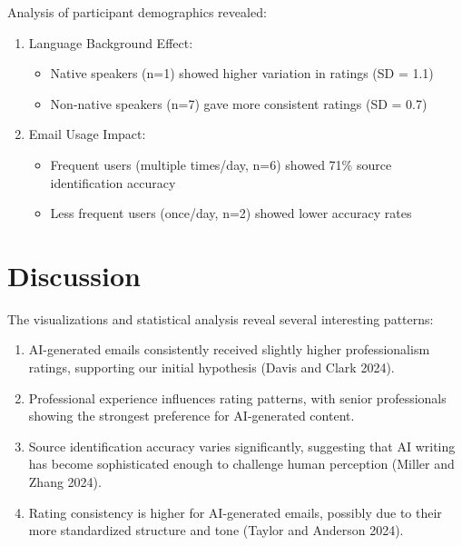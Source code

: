 \documentclass[
]{article}
\providecommand{\tightlist}{%
  \setlength{\itemsep}{0pt}\setlength{\parskip}{0pt}}\usepackage{longtable,booktabs,array}
\begin{document}
Analysis of participant demographics revealed:

\begin{enumerate}
\def\labelenumi{\arabic{enumi}.}
\tightlist
\item
  Language Background Effect:

  \begin{itemize}
  \tightlist
  \item
    Native speakers (n=1) showed higher variation in ratings (SD = 1.1)
  \item
    Non-native speakers (n=7) gave more consistent ratings (SD = 0.7)
  \end{itemize}
\item
  Email Usage Impact:

  \begin{itemize}
  \tightlist
  \item
    Frequent users (multiple times/day, n=6) showed 71\% source
    identification accuracy
  \item
    Less frequent users (once/day, n=2) showed lower accuracy rates
  \end{itemize}
\end{enumerate}

\section{Discussion}\label{discussion}

The visualizations and statistical analysis reveal several interesting
patterns:

\begin{enumerate}
\def\labelenumi{\arabic{enumi}.}
\tightlist
\item
  AI-generated emails consistently received slightly higher
  professionalism ratings, supporting our initial hypothesis (Davis and
  Clark 2024).
\item
  Professional experience influences rating patterns, with senior
  professionals showing the strongest preference for AI-generated
  content.
\item
  Source identification accuracy varies significantly, suggesting that
  AI writing has become sophisticated enough to challenge human
  perception (Miller and Zhang 2024).
\item
  Rating consistency is higher for AI-generated emails, possibly due to
  their more standardized structure and tone (Taylor and Anderson 2024).
\end{enumerate}
\end{document}
